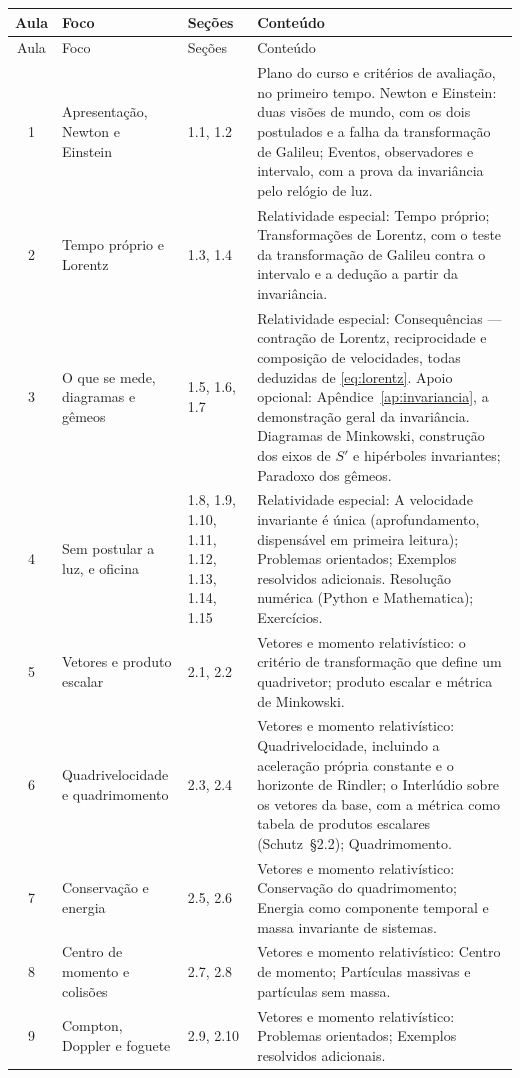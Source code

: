 \documentclass[12pt,a4paper,oneside]{book}
\theoremstyle{rgplain}
\theoremstyle{rgremark}
\begin{document}
\scriptsize
\begin{longtable}{cp{3.3cm}p{2.3cm}p{6.1cm}}
\toprule
Aula & Foco & Seções & Conteúdo \\
\midrule
\endfirsthead
\toprule
Aula & Foco & Seções & Conteúdo \\
\midrule
\endhead
1 & Apresentação, Newton e Einstein & 1.1, 1.2 & Plano do curso e critérios de avaliação, no primeiro tempo. Newton e Einstein: duas visões de mundo, com os dois postulados e a falha da transformação de Galileu; Eventos, observadores e intervalo, com a prova da invariância pelo relógio de luz. \\
2 & Tempo próprio e Lorentz & 1.3, 1.4 & Relatividade especial: Tempo próprio; Transformações de Lorentz, com o teste da transformação de Galileu contra o intervalo e a dedução a partir da invariância. \\
3 & O que se mede, diagramas e gêmeos & 1.5, 1.6, 1.7 & Relatividade especial: Consequências --- contração de Lorentz, reciprocidade e composição de velocidades, todas deduzidas de \eqref{eq:lorentz}. Apoio opcional: Apêndice~\ref{ap:invariancia}, a demonstração geral da invariância. Diagramas de Minkowski, construção dos eixos de $S'$ e hipérboles invariantes; Paradoxo dos gêmeos. \\
4 & Sem postular a luz, e oficina & 1.8, 1.9, 1.10, 1.11, 1.12, 1.13, 1.14, 1.15 & Relatividade especial: A velocidade invariante é única (aprofundamento, dispensável em primeira leitura); Problemas orientados; Exemplos resolvidos adicionais. Resolução numérica (Python e Mathematica); Exercícios. \\
5 & Vetores e produto escalar & 2.1, 2.2 & Vetores e momento relativístico: o critério de transformação que define um quadrivetor; produto escalar e métrica de Minkowski. \\
6 & Quadrivelocidade e quadrimomento & 2.3, 2.4 & Vetores e momento relativístico: Quadrivelocidade, incluindo a aceleração própria constante e o horizonte de Rindler; o Interlúdio sobre os vetores da base, com a métrica como tabela de produtos escalares (Schutz~\S2.2); Quadrimomento. \\
7 & Conservação e energia & 2.5, 2.6 & Vetores e momento relativístico: Conservação do quadrimomento; Energia como componente temporal e massa invariante de sistemas. \\
8 & Centro de momento e colisões & 2.7, 2.8 & Vetores e momento relativístico: Centro de momento; Partículas massivas e partículas sem massa. \\
9 & Compton, Doppler e foguete & 2.9, 2.10 & Vetores e momento relativístico: Problemas orientados; Exemplos resolvidos adicionais. \\

\end{longtable}
\end{document}
